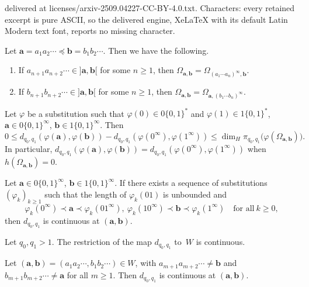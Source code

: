 \documentclass[10pt,a4paper]{amsart}
\newcommand{\ba}{\mathbf{a}}
\newcommand{\bb}{\mathbf{b}}
\begin{document}
delivered at licenses/arxiv-2509.04227-CC-BY-4.0.txt. Characters: every retained excerpt is pure ASCII, so the delivered engine, XeLaTeX with its default Latin Modern text font, reports no missing character.
\begin{lemma} \label{l:ab}
Let $\ba = a_1a_2\cdots \preceq\bb = b_1b_2\cdots$.
Then we have the following. 
\begin{enumerate}[\upshape (i)]
\itemsep.5ex
\item \label{i:ab1}
 If $a_{n+1}a_{n+2}\cdots \in{]\ba,\bb[}$ for some $n \ge 1$, then $\Omega_{\ba,\bb} = \Omega_{(a_1\cdots a_n)^\infty,\bb}$. 
\item \label{i:ab2}
If $b_{n+1}b_{n+2}\cdots \in {]\ba,\bb[}$ for some $n \ge 1$, then $\Omega_{\ba,\bb} = \Omega_{\ba,(b_1\cdots b_n)^\infty}$. 
\end{enumerate}
\end{lemma}

\begin{lemma} \label{l:phi}
Let $\varphi$ be a substitution such that $\varphi(0) \in 0\{0,1\}^*$ and $\varphi(1) \in 1\{0,1\}^*$, $\ba \in 0\{0,1\}^\infty$, $\bb \in 1\{0,1\}^\infty$.
Then
\[
0 \le d_{q_0,q_1}(\varphi(\ba),\varphi(\bb)) - d_{q_0,q_1}(\varphi(0^\infty),\varphi(1^\infty)) \le \dim_H \pi_{q_0,q_1}\big(\varphi(\Omega_{\ba,\bb})\big).
\]
In particular, $d_{q_0,q_1}(\varphi(\ba),\varphi(\bb)) = d_{q_0,q_1}(\varphi(0^\infty),\varphi(1^\infty))$ when $h(\Omega_{\ba,\bb}) = 0$.
\end{lemma}

\begin{lemma} \label{l:phik}
Let $\ba \in 0\{0,1\}^\infty$, $\bb \in 1\{0,1\}^\infty$. 
If there exists a sequence of substitutions $(\varphi_k)_{k\ge1}$ such that the length of  $\varphi_k(01)$ is unbounded and
\begin{equation*} \label{e:phii}
\varphi_k(0^\infty) \prec \ba \prec \varphi_k(01^\infty),\ \varphi_k(10^\infty) \prec \bb \prec \varphi_k(1^\infty) \quad \mbox{for all}\ k \ge 0,
\end{equation*}
then $d_{q_0,q_1}$ is continuous at $(\ba,\bb)$.
\end{lemma}

\begin{lemma} \label{l:sclose}
Let $q_0, q_1 > 1$.
The restriction of the map $d_{q_0,q_1}$ to~$W$ is continuous.
\end{lemma}

\begin{proposition} \label{p:nontogether}
Let $(\ba,\bb) = (a_1a_2\cdots, b_1b_2\cdots) \in W$, with $a_{m+1} a_{m+2} \cdots \ne \bb$ and $b_{m+1} b_{m+2}\cdots \ne \ba$ for all $m \ge 1$.
Then $d_{q_0,q_1}$ is continuous at $(\ba,\bb)$. 
\end{proposition}
\end{document}
